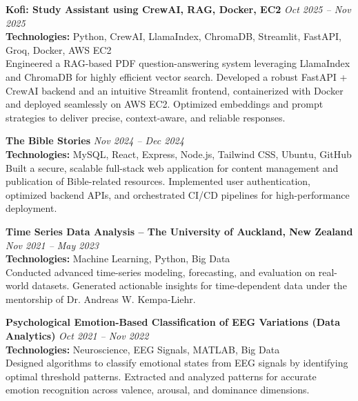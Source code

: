 \normalsize

\textcolor[RGB]{0,128,128}{\textbf{Kofi: Study Assistant using CrewAI, RAG, Docker, EC2}} \hfill \textit{Oct 2025 – Nov 2025} \\
\textbf{Technologies:} Python, CrewAI, LlamaIndex, ChromaDB, Streamlit, FastAPI, Groq, Docker, AWS EC2 \\
Engineered a RAG-based PDF question-answering system leveraging LlamaIndex and ChromaDB for highly efficient vector search. Developed a robust FastAPI + CrewAI backend and an intuitive Streamlit frontend, containerized with Docker and deployed seamlessly on AWS EC2. Optimized embeddings and prompt strategies to deliver precise, context-aware, and reliable responses.

\vspace{1em}

\textcolor[RGB]{0,128,128}{\textbf{The Bible Stories}} \hfill \textit{Nov 2024 – Dec 2024} \\
\textbf{Technologies:} MySQL, React, Express, Node.js, Tailwind CSS, Ubuntu, GitHub \\
Built a secure, scalable full-stack web application for content management and publication of Bible-related resources. Implemented user authentication, optimized backend APIs, and orchestrated CI/CD pipelines for high-performance deployment.

\vspace{1em}

\textcolor[RGB]{0,128,128}{\textbf{Time Series Data Analysis – The University of Auckland, New Zealand}} \hfill \textit{Nov 2021 – May 2023} \\
\textbf{Technologies:} Machine Learning, Python, Big Data \\
Conducted advanced time-series modeling, forecasting, and evaluation on real-world datasets. Generated actionable insights for time-dependent data under the mentorship of Dr. Andreas W. Kempa-Liehr.

\vspace{1em}

\textcolor[RGB]{0,128,128}{\textbf{Psychological Emotion-Based Classification of EEG Variations (Data Analytics)}} \hfill \textit{Oct 2021 – Nov 2022} \\
\textbf{Technologies:} Neuroscience, EEG Signals, MATLAB, Big Data \\
Designed algorithms to classify emotional states from EEG signals by identifying optimal threshold patterns. Extracted and analyzed patterns for accurate emotion recognition across valence, arousal, and dominance dimensions.

